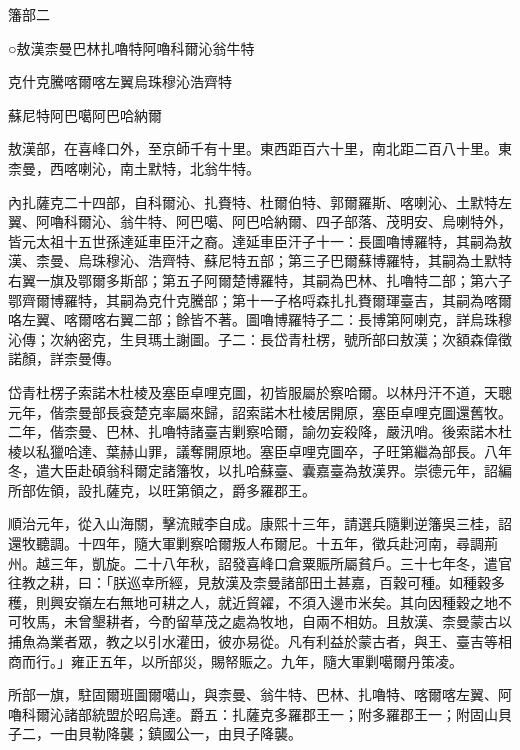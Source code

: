 
\begin{pinyinscope}
籓部二

○敖漢柰曼巴林扎嚕特阿嚕科爾沁翁牛特

克什克騰喀爾喀左翼烏珠穆沁浩齊特

蘇尼特阿巴噶阿巴哈納爾

敖漢部，在喜峰口外，至京師千有十里。東西距百六十里，南北距二百八十里。東柰曼，西喀喇沁，南土默特，北翁牛特。

內扎薩克二十四部，自科爾沁、扎賚特、杜爾伯特、郭爾羅斯、喀喇沁、土默特左翼、阿嚕科爾沁、翁牛特、阿巴噶、阿巴哈納爾、四子部落、茂明安、烏喇特外，皆元太祖十五世孫達延車臣汗之裔。達延車臣汗子十一：長圖嚕博羅特，其嗣為敖漢、柰曼、烏珠穆沁、浩齊特、蘇尼特五部；第三子巴爾蘇博羅特，其嗣為土默特右翼一旗及鄂爾多斯部；第五子阿爾楚博羅特，其嗣為巴林、扎嚕特二部；第六子鄂齊爾博羅特，其嗣為克什克騰部；第十一子格哷森扎扎賚爾琿臺吉，其嗣為喀爾咯左翼、喀爾喀右翼二部；餘皆不著。圖嚕博羅特子二：長博第阿喇克，詳烏珠穆沁傳；次納密克，生貝瑪土謝圖。子二：長岱青杜楞，號所部曰敖漢；次額森偉徵諾顏，詳柰曼傳。

岱青杜楞子索諾木杜棱及塞臣卓哩克圖，初皆服屬於察哈爾。以林丹汗不道，天聰元年，偕柰曼部長袞楚克率屬來歸，詔索諾木杜棱居開原，塞臣卓哩克圖還舊牧。二年，偕柰曼、巴林、扎嚕特諸臺吉剿察哈爾，諭勿妄殺降，嚴汛哨。後索諾木杜棱以私獵哈達、葉赫山罪，議奪開原地。塞臣卓哩克圖卒，子旺第繼為部長。八年冬，遣大臣赴碩翁科爾定諸籓牧，以扎哈蘇臺、囊嘉臺為敖漢界。崇德元年，詔編所部佐領，設扎薩克，以旺第領之，爵多羅郡王。

順治元年，從入山海關，擊流賊李自成。康熙十三年，請選兵隨剿逆籓吳三桂，詔還牧聽調。十四年，隨大軍剿察哈爾叛人布爾尼。十五年，徵兵赴河南，尋調荊州。越三年，凱旋。二十八年秋，詔發喜峰口倉粟賑所屬貧戶。三十七年冬，遣官往教之耕，曰：「朕巡幸所經，見敖漢及柰曼諸部田土甚嘉，百穀可種。如種穀多穫，則興安嶺左右無地可耕之人，就近貿糴，不須入邊巿米矣。其向因種穀之地不可牧馬，未曾墾耕者，今酌留草茂之處為牧地，自兩不相妨。且敖漢、柰曼蒙古以捕魚為業者眾，教之以引水灌田，彼亦易從。凡有利益於蒙古者，與王、臺吉等相商而行。」雍正五年，以所部災，賜帑賑之。九年，隨大軍剿噶爾丹策凌。

所部一旗，駐固爾班圖爾噶山，與柰曼、翁牛特、巴林、扎嚕特、喀爾喀左翼、阿嚕科爾沁諸部統盟於昭烏達。爵五：扎薩克多羅郡王一；附多羅郡王一；附固山貝子二，一由貝勒降襲；鎮國公一，由貝子降襲。


\end{pinyinscope}
